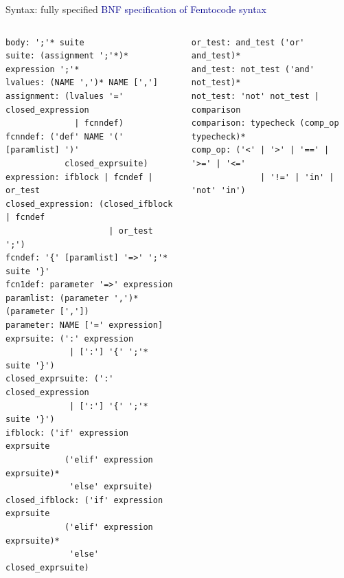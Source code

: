 \documentclass{beamer}
\begin{document}
\begin{frame}[fragile]{Syntax: fully specified}
\vspace{0.25 cm}
\textcolor{darkblue}{BNF specification of Femtocode syntax} 

\vspace{-0.5 cm}
\begin{columns}[t]
\tiny
\begin{verbatim}
body: ';'* suite
suite: (assignment ';'*)* expression ';'*
lvalues: (NAME ',')* NAME [',']
assignment: (lvalues '=' closed_expression
              | fcnndef)
fcnndef: ('def' NAME '(' [paramlist] ')'
            closed_exprsuite)
expression: ifblock | fcndef | or_test
closed_expression: (closed_ifblock | fcndef
                     | or_test ';')
fcndef: '{' [paramlist] '=>' ';'* suite '}'
fcn1def: parameter '=>' expression
paramlist: (parameter ',')* (parameter [','])
parameter: NAME ['=' expression]
exprsuite: (':' expression
             | [':'] '{' ';'* suite '}')
closed_exprsuite: (':' closed_expression
             | [':'] '{' ';'* suite '}')
ifblock: ('if' expression exprsuite
            ('elif' expression exprsuite)*
             'else' exprsuite)
closed_ifblock: ('if' expression exprsuite
            ('elif' expression exprsuite)*
             'else' closed_exprsuite)
\end{verbatim}
\vspace{-0.8 cm}
\begin{verbatim}
or_test: and_test ('or' and_test)*
and_test: not_test ('and' not_test)*
not_test: 'not' not_test | comparison
comparison: typecheck (comp_op typecheck)*
comp_op: ('<' | '>' | '==' | '>=' | '<='
              | '!=' | 'in' | 'not' 'in')
\end{verbatim}


\end{columns}
\end{frame}
\end{document}
